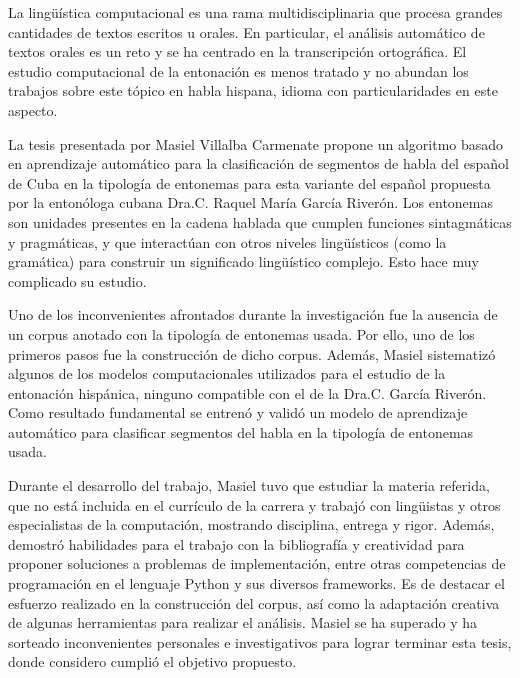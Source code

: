 \begin{opinion}
La ling\"u\'istica computacional es una rama multidisciplinaria que procesa grandes cantidades de textos escritos u orales. En particular, el an\'alisis autom\'atico de textos orales es un reto y se ha centrado en la transcripci\'on ortogr\'afica. El estudio computacional de la entonaci\'on es menos tratado y no abundan los trabajos sobre este t\'opico en habla hispana, idioma con particularidades en este aspecto. 


La tesis presentada por Masiel Villalba Carmenate propone un algoritmo basado en aprendizaje autom\'atico para la clasificaci\'on de segmentos de habla del espa\~nol de Cuba en la tipolog\'ia de entonemas para esta variante del espa\~nol propuesta por la enton\'ologa cubana Dra.C. Raquel Mar\'ia Garc\'ia River\'on. Los entonemas son unidades presentes en la cadena hablada que cumplen funciones sintagm\'aticas y pragm\'aticas, y que interact\'uan con otros niveles ling\"u\'isticos (como la gram\'atica) para construir un significado ling\"u\'istico complejo. Esto hace muy complicado su estudio.


Uno de los inconvenientes afrontados durante la investigaci\'on fue la ausencia de un corpus anotado con la tipolog\'ia de entonemas usada. Por ello, uno de los primeros pasos fue la construcci\'on de dicho corpus. Adem\'as, Masiel sistematiz\'o algunos de los modelos computacionales utilizados para el estudio de la entonaci\'on hisp\'anica, ninguno compatible con el de la Dra.C. Garc\'ia River\'on. Como resultado fundamental se entren\'o y valid\'o un modelo de aprendizaje autom\'atico para clasificar segmentos del habla en la tipolog\'ia de entonemas usada.


Durante el desarrollo del trabajo, Masiel tuvo que estudiar la materia referida, que no est\'a incluida en el curr\'iculo de la carrera y trabaj\'o con ling\"uistas y otros especialistas de la computaci\'on, mostrando disciplina, entrega y rigor. Adem\'as, demostr\'o habilidades para el trabajo con la bibliograf\'ia y  creatividad para proponer soluciones a problemas de implementaci\'on, entre otras competencias de programaci\'on en el lenguaje Python y sus diversos frameworks. Es de destacar el esfuerzo realizado en la construcci\'on del corpus, as\'i como la adaptaci\'on creativa de algunas herramientas para realizar el an\'alisis. Masiel se ha superado y ha sorteado inconvenientes personales e investigativos para lograr terminar esta tesis, donde considero cumpli\'o el objetivo propuesto.




\end{opinion}
